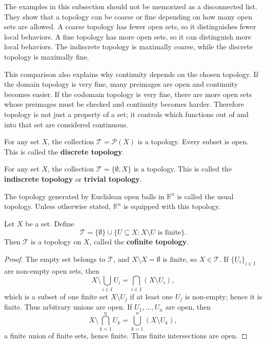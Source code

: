 The examples in this subsection should not be memorized as a disconnected list. They show that a topology can be coarse or fine depending on how many open sets are allowed. A coarse topology has fewer open sets, so it distinguishes fewer local behaviors. A fine topology has more open sets, so it can distinguish more local behaviors. The indiscrete topology is maximally coarse, while the discrete topology is maximally fine.

This comparison also explains why continuity depends on the chosen topology. If the domain topology is very fine, many preimages are open and continuity becomes easier. If the codomain topology is very fine, there are more open sets whose preimages must be checked and continuity becomes harder. Therefore topology is not just a property of a set; it controls which functions out of and into that set are considered continuous.

\begin{example}
For any set $X$, the collection $\mathcal{T}=\mathcal{P}(X)$ is a topology. Every subset is open. This is called the \textbf{discrete topology}.
\end{example}

\begin{example}
For any set $X$, the collection $\mathcal{T}=\{\emptyset,X\}$ is a topology. This is called the \textbf{indiscrete topology} or \textbf{trivial topology}.
\end{example}

\begin{example}
The topology generated by Euclidean open balls in $\mathbb{R}^n$ is called the usual topology. Unless otherwise stated, $\mathbb{R}^n$ is equipped with this topology.
\end{example}

\begin{example}
Let $X$ be a set. Define
\[
    \mathcal{T}=\{\emptyset\}\cup\{U\subseteq X:X\setminus U\text{ is finite}\}.
\]
Then $\mathcal{T}$ is a topology on $X$, called the \textbf{cofinite topology}.
\end{example}

\begin{proof}
The empty set belongs to $\mathcal{T}$, and $X\setminus X=\emptyset$ is finite, so $X\in\mathcal{T}$. If $\{U_i\}_{i\in I}$ are non-empty open sets, then
\[
    X\setminus\bigcup_{i\in I}U_i=\bigcap_{i\in I}(X\setminus U_i),
\]
which is a subset of one finite set $X\setminus U_j$ if at least one $U_j$ is non-empty; hence it is finite. Thus arbitrary unions are open. If $U_1,\dots,U_n$ are open, then
\[
    X\setminus\bigcap_{k=1}^nU_k=\bigcup_{k=1}^n(X\setminus U_k),
\]
a finite union of finite sets, hence finite. Thus finite intersections are open.
\end{proof}

